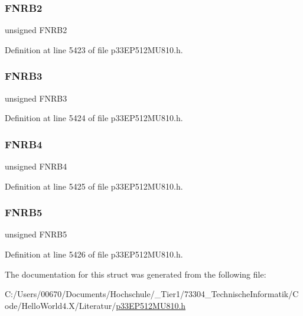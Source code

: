 \subsubsection{\texorpdfstring{F\+N\+R\+B2}{FNRB2}}
{\footnotesize\ttfamily unsigned F\+N\+R\+B2}



Definition at line 5423 of file p33\+E\+P512\+M\+U810.\+h.

\mbox{\label{structtag_c2_f_i_f_o_b_i_t_s_ab20b55838f7bd8b39c2c9b04de83ef34}} 
\subsubsection{\texorpdfstring{F\+N\+R\+B3}{FNRB3}}
{\footnotesize\ttfamily unsigned F\+N\+R\+B3}



Definition at line 5424 of file p33\+E\+P512\+M\+U810.\+h.

\mbox{\label{structtag_c2_f_i_f_o_b_i_t_s_a9095fcba1d93ad672ea64cf1cb2c0e71}} 
\subsubsection{\texorpdfstring{F\+N\+R\+B4}{FNRB4}}
{\footnotesize\ttfamily unsigned F\+N\+R\+B4}



Definition at line 5425 of file p33\+E\+P512\+M\+U810.\+h.

\mbox{\label{structtag_c2_f_i_f_o_b_i_t_s_a5397efb64ea26a685f138eeda891a3b6}} 
\subsubsection{\texorpdfstring{F\+N\+R\+B5}{FNRB5}}
{\footnotesize\ttfamily unsigned F\+N\+R\+B5}



Definition at line 5426 of file p33\+E\+P512\+M\+U810.\+h.



The documentation for this struct was generated from the following file\+:\begin{DoxyCompactItemize}
\item 
C\+:/\+Users/00670/\+Documents/\+Hochschule/\+\_\+\+Tier1/73304\+\_\+\+Technische\+Informatik/\+Code/\+Hello\+World4.\+X/\+Literatur/\hyperlink{p33_e_p512_m_u810_8h}{p33\+E\+P512\+M\+U810.\+h}\end{DoxyCompactItemize}
